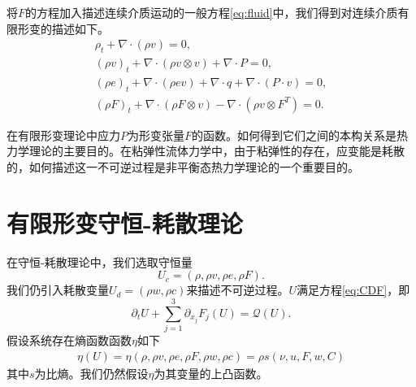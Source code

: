 \documentclass{article}
\begin{document}
将$F$的方程加入描述连续介质运动的一般方程\eqref{eq:fluid}中，我们得到对连续介质有限形变的描述如下。
\begin{subequations}\label{eq:continuum}
\begin{align}
\rho_t + \nabla \cdot (\rho v )=0, \\
(\rho v)_t + \nabla \cdot (\rho v \otimes v) + \nabla \cdot P = 0, \\
(\rho e)_t + \nabla \cdot (\rho e v) + \nabla \cdot q + \nabla \cdot (P \cdot v) = 0 ,\\
(\rho F)_t + \nabla \cdot (\rho F \otimes v) - \nabla \cdot (\rho v \otimes F^T) = 0 .
\end{align}
\end{subequations}

在有限形变理论中应力$P$为形变张量$F$的函数。如何得到它们之间的本构关系是热力学理论的主要目的。在粘弹性流体力学中，由于粘弹性的存在，应变能是耗散的，如何描述这一不可逆过程是非平衡态热力学理论的一个重要目的。

\section{有限形变守恒-耗散理论}
在守恒-耗散理论中，我们选取守恒量
$$U_c = (\rho, \rho v, \rho e, \rho F).$${}
我们仍引入耗散变量$U_d = (\rho w,\rho c)$来描述不可逆过程。$U$满足方程\eqref{eq:CDF}，即
\begin{equation*}
		\partial_t U + \sum_{j=1}^3 \partial_{x_j} F_j(U) = \mathcal{Q} (U) .
\end{equation*}
假设系统存在熵函数函数$\eta$如下
\begin{eqnarray*}
\eta(U) = \eta(\rho, \rho v, \rho e,\rho F,\rho w, \rho c) = \rho s(\nu,u,F,w,C)
\end{eqnarray*}
其中$s$为比熵。我们仍然假设$\eta$为其变量的上凸函数。
\end{document}
